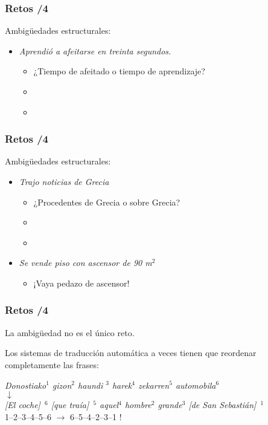 \documentclass{beamer}
\begin{document}
\begin{frame}
  \frametitle{Retos /4}
  Ambigüedades estructurales:
  \begin{itemize}
  \item \emph{Aprendió a afeitarse en treinta segundos.}
    \begin{itemize}
    \item ¿Tiempo de afeitado o tiempo de aprendizaje?
    \item \emph{ } 
    \item \emph{ } 
    \end{itemize}
  \end{itemize}
\end{frame}

\begin{frame}
  \frametitle{Retos /4}
  Ambigüedades estructurales:
  \begin{itemize}
  \item \emph{Trajo noticias de Grecia}
    \begin{itemize}
    \item ¿Procedentes de Grecia o sobre Grecia?
    \item \emph{}
    \item \emph{ }
    \end{itemize}
  \item \emph{Se vende piso con ascensor de 90 m$^2$}
    \begin{itemize}
    \item ¡Vaya pedazo de ascensor!
    \end{itemize}
  \end{itemize}
\end{frame}

\begin{frame}
\frametitle{Retos /4}
La ambigüedad no es el único reto.

Los sistemas de traducción automática a veces tienen que reordenar completamente las frases:
\begin{center}
  \emph{Donostiako$^1$ gizon$^2$ haundi $^3$ harek$^4$ zekarren$^5$ automobila$^6$} \\ 
  $\downarrow$
  \\
  \emph{[El coche]\ $^6$ [que traía]\ $^5$ aquel$^4$ hombre$^2$ grande$^3$ [de San Sebastián]\ $^1$} \\[1cm]
 1--2--3--4--5--6 $\to$ 6--5--4--2--3--1 ! 
\end{center}
\end{frame}
\end{document}

